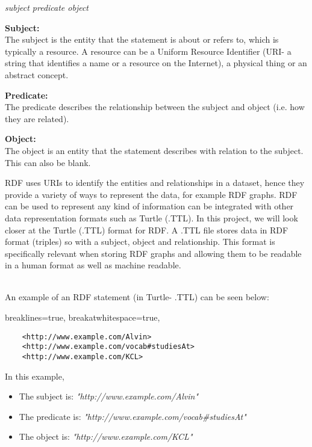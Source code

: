 \begin{center}
   \textit{subject predicate object}
\end{center} 

\textbf{Subject:} \\
The subject is the entity that the statement is about or refers to, which is typically a resource. A resource can be a Uniform Resource Identifier (URI- a string that identifies a name or a resource on the Internet), a physical thing or an abstract concept. 

\textbf{Predicate:} \\
The predicate describes the relationship between the subject and object (i.e. how they are related). 

\textbf{Object:} \\
The object is an entity that the statement describes with relation to the subject. This can also be blank. 

RDF uses URIs to identify the entities and relationships in a dataset, hence they provide a variety of ways to represent the data, for example RDF graphs. RDF can be used to represent any kind of information can be integrated with other data representation formats such as Turtle (.TTL). In this project, we will look closer at the Turtle (.TTL) format for RDF. A .TTL file stores data in RDF format (triples) so with a subject, object and relationship. This format is specifically relevant when storing RDF graphs and allowing them to be readable in a human format as well as machine readable. \cite{TTL}

\medskip
\\ An example of an RDF statement (in Turtle- .TTL) can be seen below:

\lstset
{
    breaklines=true,
    breakatwhitespace=true,
}
\begin{center}
\begin{lstlisting}
    <http://www.example.com/Alvin> 
    <http://www.example.com/vocab#studiesAt> 
    <http://www.example.com/KCL>
\end{lstlisting}
\end{center} 

\noindent In this example, 
\begin{itemize}
\item The subject is: \textit{"http://www.example.com/Alvin"}
\item The predicate is: \textit{"http://www.example.com/vocab#studiesAt"}
\item The object is: \textit{"http://www.example.com/KCL"}
\end{itemize}

